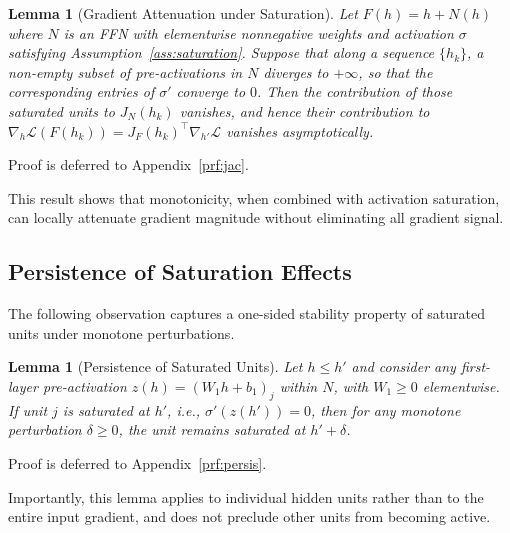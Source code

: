 \documentclass{article}
\theoremstyle{plain}
\newtheorem{lemma}[theorem]{Lemma}
\theoremstyle{definition}
\theoremstyle{remark}
\begin{document}
\begin{lemma}[Gradient Attenuation under Saturation]
\label{lem:gradient-attenuation}
Let $F(h)=h+N(h)$ where $N$ is an FFN with elementwise nonnegative weights and
activation $\sigma$ satisfying Assumption~\ref{ass:saturation}. Suppose that along
a sequence $\{h_k\}$, a non-empty subset of pre-activations in $N$ diverges to
$+\infty$, so that the corresponding entries of $\sigma'$ converge to $0$.
Then the contribution of those saturated units to $J_N(h_k)$ vanishes, and hence
their contribution to $\nabla_h \mathcal{L}(F(h_k)) = J_F(h_k)^\top \nabla_{h'}\mathcal{L}$
vanishes asymptotically.
\end{lemma}


Proof is deferred to Appendix~\ref{prf:jac}.

This result shows that monotonicity, when combined with activation saturation,
can locally attenuate gradient magnitude without eliminating all gradient signal.


\subsection{Persistence of Saturation Effects}

The following observation captures a one-sided stability property of saturated
units under monotone perturbations.

\begin{lemma}[Persistence of Saturated Units]
\label{lem:persistence}
Let $h \le h'$ and consider any first-layer pre-activation $z(h)= (W_1 h + b_1)_j$
within $N$, with $W_1\ge 0$ elementwise. If unit $j$ is saturated at $h'$, i.e.,
$\sigma'(z(h'))=0$, then for any monotone perturbation $\delta\ge 0$,
the unit remains saturated at $h'+\delta$.
\end{lemma}


Proof is deferred to Appendix~\ref{prf:persis}.

Importantly, this lemma applies to individual hidden units rather than to the
entire input gradient, and does not preclude other units from becoming active.
\end{document}
